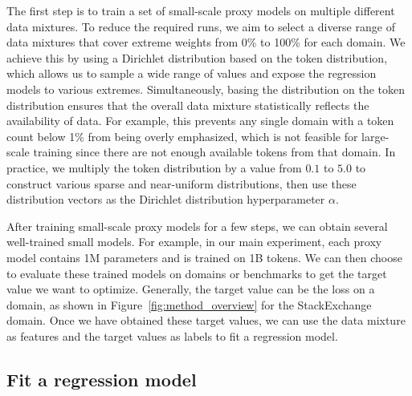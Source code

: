 The first step is to train a set of small-scale proxy models on multiple different data mixtures.
To reduce the required runs, we aim to select a diverse range of data mixtures that cover extreme weights from 0\% to 100\% for each domain.
We achieve this by using a Dirichlet distribution based on the token distribution, which allows us to sample a wide range of values and expose the regression models to various extremes.
Simultaneously, basing the distribution on the token distribution ensures that the overall data mixture statistically reflects the availability of data.
For example, this prevents any single domain with a token count below 1\% from being overly emphasized, which is not feasible for large-scale training since there are not enough available tokens from that domain.
In practice, we multiply the token distribution by a value from $0.1$ to $5.0$ to construct various sparse and near-uniform distributions, then use these distribution vectors as the Dirichlet distribution hyperparameter $\alpha$. 

After training small-scale proxy models for a few steps, we can obtain several well-trained small models. For example, in our main experiment, each proxy model contains 1M parameters and is trained on 1B tokens. We can then choose to evaluate these trained models on domains or benchmarks to get the target value we want to optimize.
Generally, the target value can be the loss on a domain, as shown in Figure~\ref{fig:method_overview} for the StackExchange domain.
Once we have obtained these target values, we can use the data mixture as features and the target values as labels to fit a regression model.

\subsection{Fit a regression model}

